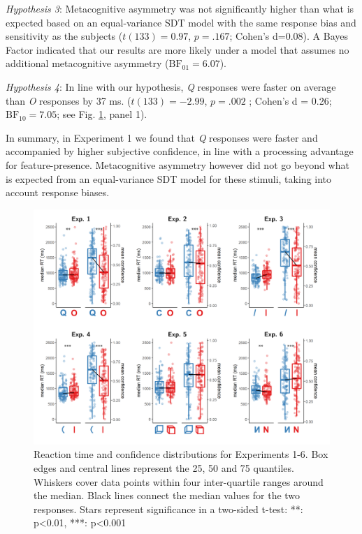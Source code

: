 \documentclass[12pt,twoside]{reedthesis}
\begin{document}
\emph{Hypothesis 3}: Metacognitive asymmetry was not significantly higher than what is expected based on an equal-variance SDT model with the same response bias and sensitivity as the subjects (\(t(133) = 0.97\), \(p = .167\); Cohen's d=0.08). A Bayes Factor indicated that our results are more likely under a model that assumes no additional metacognitive asymmetry (\(\mathrm{BF}_{\textrm{01}} = 6.07\)).

\emph{Hypothesis 4}: In line with our hypothesis, \emph{Q} responses were faster on average than \emph{O} responses by 37 ms. (\(t(133) = -2.99\), \(p = .002\) ; Cohen's d = 0.26; \(\mathrm{BF}_{\textrm{10}} = 7.05\); see Fig. \ref{fig:asymmetry-all-distributions}, panel 1).

In summary, in Experiment 1 we found that \emph{Q} responses were faster and accompanied by higher subjective confidence, in line with a processing advantage for feature-presence. Metacognitive asymmetry however did not go beyond what is expected from an equal-variance SDT model for these stimuli, taking into account response biases.


\begin{figure}
\includegraphics[width=1\linewidth]{figure/asymmetry/hists} \caption[Confidence and reaction time effects for Experiments 1-6]{Reaction time and confidence distributions for Experiments 1-6. Box edges and central lines represent the 25, 50 and 75 quantiles. Whiskers cover data points within four inter-quartile ranges around the median. Black lines connect the median values for the two responses. Stars represent significance in a two-sided t-test: **: p\textless0.01, ***: p\textless0.001}\label{fig:asymmetry-all-distributions}
\end{figure}
\end{document}
